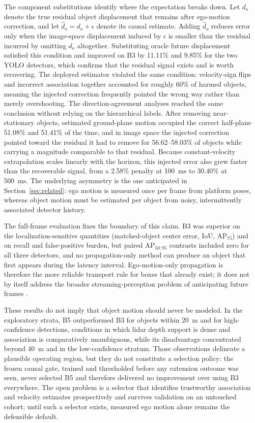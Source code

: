 \documentclass[journal]{IEEEtran}
\begin{document}
The component substitutions identify where the expectation breaks down. Let $d_o$ denote the true residual object displacement that remains after ego-motion correction, and let $\widehat{d}_o=d_o+\epsilon$ denote its causal estimate. Adding $\widehat{d}_o$ reduces error only when the image-space displacement induced by $\epsilon$ is smaller than the residual incurred by omitting $d_o$ altogether. Substituting oracle future displacement satisfied this condition and improved on B3 by 11.11\% and 9.85\% for the two YOLO detectors, which confirms that the residual signal exists and is worth recovering. The deployed estimator violated the same condition: velocity-sign flips and incorrect association together accounted for roughly 60\% of harmed objects, meaning the injected correction frequently pointed the wrong way rather than merely overshooting. The direction-agreement analyses reached the same conclusion without relying on the hierarchical labels. After removing near-stationary objects, estimated ground-plane motion occupied the correct half-plane 51.08\% and 51.41\% of the time, and in image space the injected correction pointed toward the residual it had to remove for 56.62--58.03\% of objects while carrying a magnitude comparable to that residual. Because constant-velocity extrapolation scales linearly with the horizon, this injected error also grew faster than the recoverable signal, from a 2.58\% penalty at 100~ms to 30.40\% at 500~ms. The underlying asymmetry is the one anticipated in Section~\ref{sec:related}: ego motion is measured once per frame from platform poses, whereas object motion must be estimated per object from noisy, intermittently associated detector history.

The full-frame evaluation fixes the boundary of this claim. B3 was superior on the localization-sensitive quantities (matched-object center error, IoU, AP$_{75}$) and on recall and false-positive burden, but paired AP$_{50:95}$ contrasts included zero for all three detectors, and no propagation-only method can produce an object that first appears during the latency interval. Ego-motion-only propagation is therefore the more reliable transport rule for boxes that already exist; it does not by itself address the broader streaming-perception problem of anticipating future frames \cite{Li2020Streaming,Yang2022Streaming,Wang2023ASAP}.

These results do not imply that object motion should never be modeled. In the exploratory strata, B5 outperformed B3 for objects within 20~m and for high-confidence detections, conditions in which lidar depth support is dense and association is comparatively unambiguous, while its disadvantage concentrated beyond 40~m and in the low-confidence stratum. Those observations delineate a plausible operating region, but they do not constitute a selection policy: the frozen causal gate, trained and thresholded before any extension outcome was seen, never selected B5 and therefore delivered no improvement over using B3 everywhere. The open problem is a selector that identifies trustworthy association and velocity estimates prospectively and survives validation on an untouched cohort; until such a selector exists, measured ego motion alone remains the defensible default.
\end{document}
